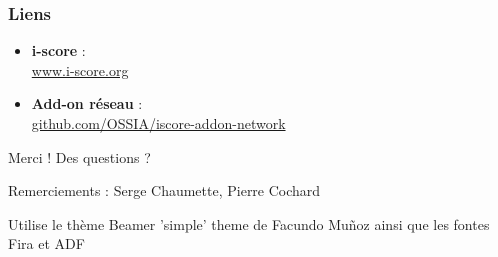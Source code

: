 \documentclass[handout]{beamer}
\begin{document}
\begin{frame}[allowframebreaks]%
    
    
    
    {\scriptsize
        \nocite{*}
        \printbibliography
    }
\end{frame}

\begin{frame}
    \frametitle{Liens} 
    \Large
    \begin{itemize}
        \setlength\itemsep{1em}
        \item \textbf{i-score} :~\\ {\small \url{www.i-score.org} }
        \item \textbf{Add-on réseau} :~\\ {\small \url{github.com/OSSIA/iscore-addon-network} }
    \end{itemize}
        
    \centering
    \vspace{2em}
    \Large{Merci ! Des questions ?}
    \vspace{2em}
    
    \small{Remerciements : Serge Chaumette, Pierre Cochard}
    
    \vspace{1em}
    
    \tiny{Utilise le thème Beamer 'simple' theme de Facundo Muñoz ainsi que les fontes Fira et ADF}
\end{frame}
\end{document}
